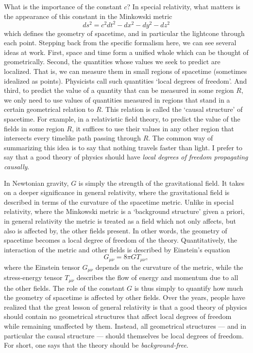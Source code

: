 What is the importance of the constant $c$?   In special relativity,
what matters is the appearance of this constant in the Minkowski
metric 
\[                ds^2 = c^2 dt^2 - dx^2 - dy^2 - dz^2  \] 
which defines the geometry of spacetime, and in particular the lightcone
through each point.  Stepping back from the specific formalism here, we
can see several ideas at work.  First, space and time form a unified
whole which can be thought of geometrically.  Second, the quantities
whose values we seek to predict are localized.  That is, we can measure
them in small regions of spacetime (sometimes idealized as points).  
Physicists call such quantities `local degrees of freedom'.  And third,
to predict the value of a quantity that can be measured in some region
$R$, we only need to use values of quantities measured in regions that
stand in a certain geometrical relation to $R$.  This relation is called
the `causal structure' of spacetime.  For example, in a relativistic
field theory, to predict the value of the fields in some region $R$, it
suffices to use their values in any other region that intersects every
timelike path passing through $R$.  The common way of summarizing this
idea is to say that nothing travels faster than light.  I prefer to say
that a good theory of physics should have {\it local degrees of freedom
propagating causally}. 

In Newtonian gravity, $G$ is simply the strength of the gravitational
field.  It takes on a deeper significance in general relativity, where
the gravitational field is described in terms of the curvature of the
spacetime metric.  Unlike in special relativity, where the Minkowski 
metric is a `background structure' given a priori, in general relativity
the metric is treated as a field which not only affects, but also is
affected by, the other fields present.  In other words, the geometry of
spacetime becomes a local degree of freedom of the theory.
Quantitatively, the interaction of the metric and other fields is
described by Einstein's equation
\[                 G_{\mu \nu} = 8\pi G T_{\mu \nu} ,\]
where the Einstein tensor $G_{\mu \nu}$ depends on the curvature of the
metric, while the stress-energy tensor $T_{\mu \nu}$ describes the flow
of energy and momentum due to all the other fields.  The role of the
constant $G$ is thus simply to quantify how much the geometry of
spacetime is affected by other fields.   Over the years, people have
realized that the great lesson of general relativity is that a good
theory of physics should contain no geometrical structures that affect
local degrees of freedom while remaining unaffected by them.  Instead,
all geometrical structures --- and in particular the causal structure ---
should themselves be local degrees of freedom.  For short, one says
that the theory should be {\it background-free}.
 
